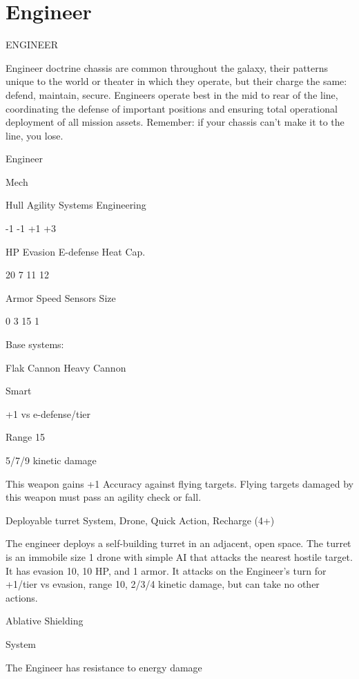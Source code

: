\section{Engineer}
                                              ENGINEER  

Engineer doctrine chassis are common throughout the galaxy, their patterns unique to the world  
or theater in which they operate, but their charge the same: defend, maintain, secure. Engineers  
operate best in the mid to rear of the line, coordinating the defense of important positions and  
ensuring total operational deployment of all mission assets. Remember: if your chassis can’t  
make it to the line, you lose.
 

 Engineer 

 Mech 

 Hull       Agility      Systems       Engineering 

 -1         -1           +1            +3 

 HP         Evasion      E-defense     Heat Cap. 

 20         7            11            12 

 Armor      Speed        Sensors       Size 

 0          3            15            1 

Base systems:
 
Flak Cannon  
Heavy Cannon
 
Smart
 
+1 vs e-defense/tier
 
Range 15
 
5/7/9 kinetic damage
 
This weapon gains +1 Accuracy against flying targets. Flying targets damaged by this weapon  
must pass an agility check or fall.
 

Deployable turret  
System, Drone, Quick Action, Recharge (4+)
 
The engineer deploys a self-building turret in an adjacent, open space. The turret is an immobile  
size 1 drone with simple AI that attacks the nearest hostile target. It has evasion 10, 10 HP, and 1  
armor. It attacks on the Engineer’s turn for +1/tier vs evasion, range 10, 2/3/4 kinetic damage,  
but can take no other actions.
 

Ablative Shielding
 
System
 
The Engineer has resistance to energy damage
 

